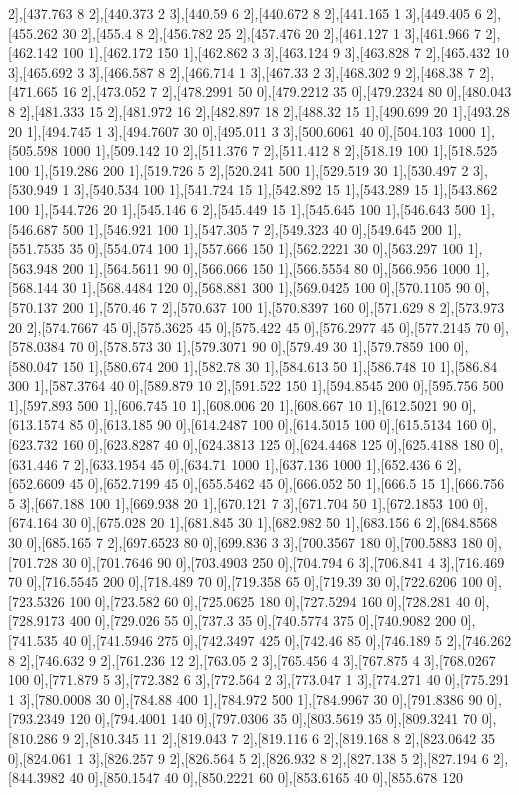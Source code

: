 {2],[437.763 8 2],[440.373 2 3],[440.59 6 2],[440.672 8 2],[441.165 1 3],[449.405 6 2],[455.262 30 2],[455.4 8 2],[456.782 25 2],[457.476 20 2],[461.127 1 3],[461.966 7 2],[462.142 100 1],[462.172 150 1],[462.862 3 3],[463.124 9 3],[463.828 7 2],[465.432 10 3],[465.692 3 3],[466.587 8 2],[466.714 1 3],[467.33 2 3],[468.302 9 2],[468.38 7 2],[471.665 16 2],[473.052 7 2],[478.2991 50 0],[479.2212 35 0],[479.2324 80 0],[480.043 8 2],[481.333 15 2],[481.972 16 2],[482.897 18 2],[488.32 15 1],[490.699 20 1],[493.28 20 1],[494.745 1 3],[494.7607 30 0],[495.011 3 3],[500.6061 40 0],[504.103 1000 1],[505.598 1000 1],[509.142 10 2],[511.376 7 2],[511.412 8 2],[518.19 100 1],[518.525 100 1],[519.286 200 1],[519.726 5 2],[520.241 500 1],[529.519 30 1],[530.497 2 3],[530.949 1 3],[540.534 100 1],[541.724 15 1],[542.892 15 1],[543.289 15 1],[543.862 100 1],[544.726 20 1],[545.146 6 2],[545.449 15 1],[545.645 100 1],[546.643 500 1],[546.687 500 1],[546.921 100 1],[547.305 7 2],[549.323 40 0],[549.645 200 1],[551.7535 35 0],[554.074 100 1],[557.666 150 1],[562.2221 30 0],[563.297 100 1],[563.948 200 1],[564.5611 90 0],[566.066 150 1],[566.5554 80 0],[566.956 1000 1],[568.144 30 1],[568.4484 120 0],[568.881 300 1],[569.0425 100 0],[570.1105 90 0],[570.137 200 1],[570.46 7 2],[570.637 100 1],[570.8397 160 0],[571.629 8 2],[573.973 20 2],[574.7667 45 0],[575.3625 45 0],[575.422 45 0],[576.2977 45 0],[577.2145 70 0],[578.0384 70 0],[578.573 30 1],[579.3071 90 0],[579.49 30 1],[579.7859 100 0],[580.047 150 1],[580.674 200 1],[582.78 30 1],[584.613 50 1],[586.748 10 1],[586.84 300 1],[587.3764 40 0],[589.879 10 2],[591.522 150 1],[594.8545 200 0],[595.756 500 1],[597.893 500 1],[606.745 10 1],[608.006 20 1],[608.667 10 1],[612.5021 90 0],[613.1574 85 0],[613.185 90 0],[614.2487 100 0],[614.5015 100 0],[615.5134 160 0],[623.732 160 0],[623.8287 40 0],[624.3813 125 0],[624.4468 125 0],[625.4188 180 0],[631.446 7 2],[633.1954 45 0],[634.71 1000 1],[637.136 1000 1],[652.436 6 2],[652.6609 45 0],[652.7199 45 0],[655.5462 45 0],[666.052 50 1],[666.5 15 1],[666.756 5 3],[667.188 100 1],[669.938 20 1],[670.121 7 3],[671.704 50 1],[672.1853 100 0],[674.164 30 0],[675.028 20 1],[681.845 30 1],[682.982 50 1],[683.156 6 2],[684.8568 30 0],[685.165 7 2],[697.6523 80 0],[699.836 3 3],[700.3567 180 0],[700.5883 180 0],[701.728 30 0],[701.7646 90 0],[703.4903 250 0],[704.794 6 3],[706.841 4 3],[716.469 70 0],[716.5545 200 0],[718.489 70 0],[719.358 65 0],[719.39 30 0],[722.6206 100 0],[723.5326 100 0],[723.582 60 0],[725.0625 180 0],[727.5294 160 0],[728.281 40 0],[728.9173 400 0],[729.026 55 0],[737.3 35 0],[740.5774 375 0],[740.9082 200 0],[741.535 40 0],[741.5946 275 0],[742.3497 425 0],[742.46 85 0],[746.189 5 2],[746.262 8 2],[746.632 9 2],[761.236 12 2],[763.05 2 3],[765.456 4 3],[767.875 4 3],[768.0267 100 0],[771.879 5 3],[772.382 6 3],[772.564 2 3],[773.047 1 3],[774.271 40 0],[775.291 1 3],[780.0008 30 0],[784.88 400 1],[784.972 500 1],[784.9967 30 0],[791.8386 90 0],[793.2349 120 0],[794.4001 140 0],[797.0306 35 0],[803.5619 35 0],[809.3241 70 0],[810.286 9 2],[810.345 11 2],[819.043 7 2],[819.116 6 2],[819.168 8 2],[823.0642 35 0],[824.061 1 3],[826.257 9 2],[826.564 5 2],[826.932 8 2],[827.138 5 2],[827.194 6 2],[844.3982 40 0],[850.1547 40 0],[850.2221 60 0],[853.6165 40 0],[855.678 120 }

